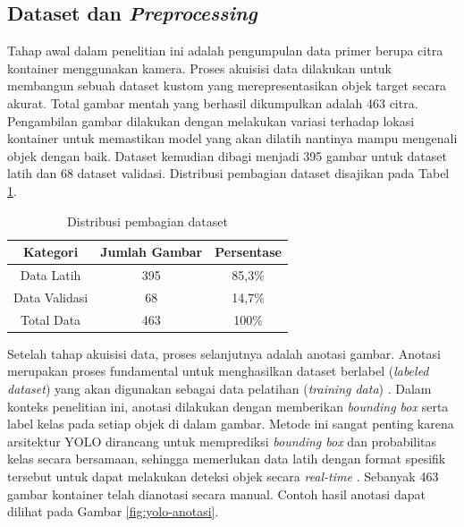 \subsection{Dataset dan \textit{Preprocessing}}
Tahap awal dalam penelitian ini adalah pengumpulan data primer berupa
citra kontainer menggunakan kamera. Proses akuisisi data dilakukan
untuk membangun sebuah dataset kustom yang merepresentasikan objek
target secara akurat. Total gambar mentah yang berhasil dikumpulkan
adalah 463 citra. Pengambilan gambar dilakukan dengan melakukan
variasi terhadap lokasi kontainer untuk memastikan model yang akan
dilatih nantinya mampu mengenali objek dengan baik. Dataset kemudian
dibagi menjadi 395 gambar untuk dataset latih dan 68 dataset
validasi. Distribusi pembagian dataset disajikan pada Tabel
\ref{tab:pembagian-dataset}.

\begin{table}[H]
  \caption{Distribusi pembagian dataset}
  \label{tab:pembagian-dataset}
  \vspace{-1em}
  \centering
  \begin{tabular}{ccc}
    \toprule
    \textbf{Kategori} & \textbf{Jumlah Gambar} & \textbf{Persentase} \\
    \midrule
    Data Latih & 395 & 85,3\% \\
    Data Validasi & 68 & 14,7\% \\
    Total Data & 463 & 100\% \\
    \bottomrule
  \end{tabular}
\end{table}

Setelah tahap akuisisi data, proses selanjutnya adalah anotasi
gambar. Anotasi merupakan proses fundamental untuk menghasilkan
dataset berlabel (\textit{labeled dataset}) yang akan digunakan
sebagai data pelatihan (\textit{training data}) \citep{19}. Dalam
konteks penelitian
ini, anotasi dilakukan dengan memberikan \textit{bounding box} serta label
kelas pada setiap objek di dalam gambar. Metode ini sangat penting
karena arsitektur YOLO dirancang untuk memprediksi \textit{bounding box} dan
probabilitas kelas secara bersamaan, sehingga memerlukan data latih
dengan format spesifik tersebut untuk dapat melakukan deteksi objek
secara \textit{real-time} \citep{20}. Sebanyak 463 gambar kontainer
telah dianotasi
secara manual. Contoh hasil anotasi dapat dilihat pada Gambar
\ref{fig:yolo-anotasi}.

